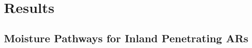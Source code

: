 \documentclass[draft]{agujournal2019}
\begin{document}
\section{Results}

\subsection{Moisture Pathways for Inland Penetrating ARs}
\label{sec:results:moisture_pathways}
%
\end{document}
